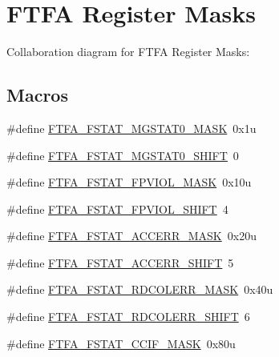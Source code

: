 \hypertarget{group___f_t_f_a___register___masks}{}\section{F\+T\+FA Register Masks}
\label{group___f_t_f_a___register___masks}
Collaboration diagram for F\+T\+FA Register Masks\+:
\subsection*{Macros}
\begin{DoxyCompactItemize}
\item 
\#define \hyperlink{group___f_t_f_a___register___masks_ga56163f418850b05a9fb528e94bbc026e}{F\+T\+F\+A\+\_\+\+F\+S\+T\+A\+T\+\_\+\+M\+G\+S\+T\+A\+T0\+\_\+\+M\+A\+SK}~0x1u
\item 
\#define \hyperlink{group___f_t_f_a___register___masks_ga61b25328b4e91259c518051ad485c9e1}{F\+T\+F\+A\+\_\+\+F\+S\+T\+A\+T\+\_\+\+M\+G\+S\+T\+A\+T0\+\_\+\+S\+H\+I\+FT}~0
\item 
\#define \hyperlink{group___f_t_f_a___register___masks_ga371bc7284b6d2e14f852e4e7e0316fef}{F\+T\+F\+A\+\_\+\+F\+S\+T\+A\+T\+\_\+\+F\+P\+V\+I\+O\+L\+\_\+\+M\+A\+SK}~0x10u
\item 
\#define \hyperlink{group___f_t_f_a___register___masks_ga92718795ccbab208784ed798d252567e}{F\+T\+F\+A\+\_\+\+F\+S\+T\+A\+T\+\_\+\+F\+P\+V\+I\+O\+L\+\_\+\+S\+H\+I\+FT}~4
\item 
\#define \hyperlink{group___f_t_f_a___register___masks_gaf7824945e3224ae270302e23286e9e34}{F\+T\+F\+A\+\_\+\+F\+S\+T\+A\+T\+\_\+\+A\+C\+C\+E\+R\+R\+\_\+\+M\+A\+SK}~0x20u
\item 
\#define \hyperlink{group___f_t_f_a___register___masks_ga3bbe94d5c4203cd6eebe9e0e78f555aa}{F\+T\+F\+A\+\_\+\+F\+S\+T\+A\+T\+\_\+\+A\+C\+C\+E\+R\+R\+\_\+\+S\+H\+I\+FT}~5
\item 
\#define \hyperlink{group___f_t_f_a___register___masks_ga96b65895e79e6256e4312d5677dd8ae2}{F\+T\+F\+A\+\_\+\+F\+S\+T\+A\+T\+\_\+\+R\+D\+C\+O\+L\+E\+R\+R\+\_\+\+M\+A\+SK}~0x40u
\item 
\#define \hyperlink{group___f_t_f_a___register___masks_ga4d4481b6c7d09a3bd6969cdf66a00d75}{F\+T\+F\+A\+\_\+\+F\+S\+T\+A\+T\+\_\+\+R\+D\+C\+O\+L\+E\+R\+R\+\_\+\+S\+H\+I\+FT}~6
\item 
\#define \hyperlink{group___f_t_f_a___register___masks_ga7c3a9f7d0c5882721425d4c46b27a24d}{F\+T\+F\+A\+\_\+\+F\+S\+T\+A\+T\+\_\+\+C\+C\+I\+F\+\_\+\+M\+A\+SK}~0x80u

\end{DoxyCompactItemize}
